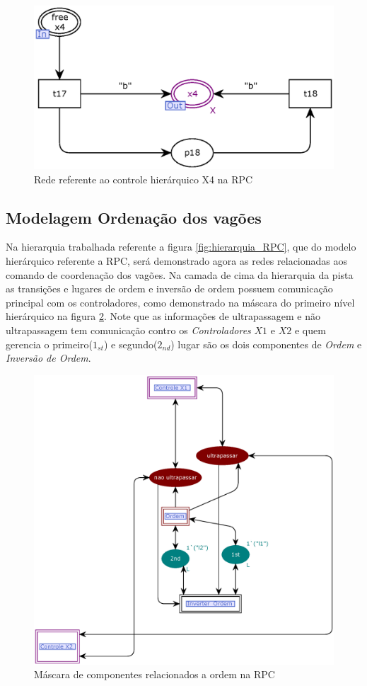 \begin{figure}[ht]
    \centering
    \caption{Rede referente ao controle hierárquico X4 na RPC}
    \label{fig:controle_x4}
    \includegraphics[width=0.6\linewidth]{figures//Simulation//Modelagem/controle_x4.eps}
\end{figure}

\clearpage 
\subsection{Modelagem Ordenação dos vagões}
\label{sub:model_ord}
Na hierarquia trabalhada referente a figura \ref{fig:hierarquia_RPC}, que do modelo hierárquico referente a RPC, será demonstrado agora as redes relacionadas aos comando de coordenação dos vagões. Na camada de cima da hierarquia da pista as transições e lugares de ordem e inversão de ordem possuem comunicação principal com os controladores, como demonstrado na máscara do primeiro nível hierárquico na figura \ref{fig:pista_ordem}. Note que as informações de ultrapassagem e não ultrapassagem tem comunicação contro os \textit{Controladores} $X1$ e $X2$ e quem gerencia o primeiro($1_{st}$) e segundo($2_{nd}$) lugar são os dois componentes de \textit{Ordem} e\textit{ Inversão de Ordem}.

\begin{figure}[ht]
    \centering
    \caption{Máscara de componentes relacionados a ordem na RPC}
    \label{fig:pista_ordem}
    \includegraphics[width=0.8\linewidth]{figures//Simulation//Modelagem/pista_ordem.eps}
\end{figure}

